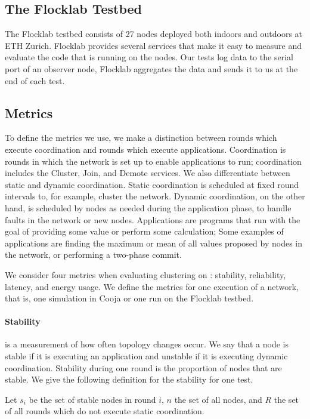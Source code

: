 \subsection{The Flocklab Testbed}
The Flocklab testbed \cite{Lim2013-flocklab-introduction} consists of 27 nodes deployed both indoors and outdoors at ETH Zurich. Flocklab provides several services that make it easy to measure and evaluate the code that is running on the nodes. Our tests log data to the serial port of an observer node, Flocklab aggregates the data and sends it to us at the end of each test. 


\subsection{Metrics}
\begin{newtext}
To define the metrics we use, we make a distinction between rounds which execute coordination and rounds which execute applications. Coordination is rounds in which the network is set up to enable applications to run; coordination includes the Cluster, Join, and Demote services. We also differentiate between static and dynamic coordination. Static coordination is scheduled at fixed round intervals to, for example, cluster the network. Dynamic coordination, on the other hand, is scheduled by nodes as needed during the application phase, to handle faults in the network or new nodes. Applications are programs that run with the goal of providing some value or perform some calculation; Some examples of applications are finding the maximum or mean of all values proposed by nodes in the network, or performing a two-phase commit.

We consider four metrics when evaluating clustering on \atwo{}: stability, reliability, latency, and energy usage. We define the metrics for one execution of a network, that is, one simulation in Cooja or one run on the Flocklab testbed.


\paragraph*{Stability} is a measurement of how often topology changes occur. We say that a node is stable if it is executing an application and unstable if it is executing dynamic coordination. Stability during one round is the proportion of nodes that are stable. We give the following definition for the stability for one test. 


\begin{Definitions}{}{}
Let $s_i$ be the set of stable nodes in round $i$, $n$ the set of all nodes, and $R$ the set of all rounds which do not execute static coordination.


\end{Definitions}
\end{newtext}
